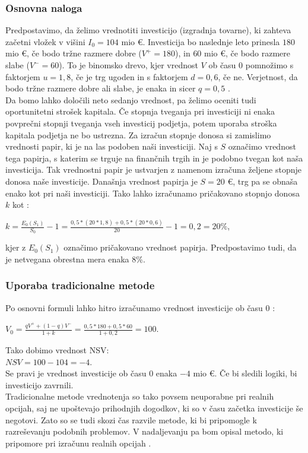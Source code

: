 \subsubsection{Osnovna naloga}
Predpostavimo, da želimo vrednotiti investicijo (izgradnja tovarne), ki zahteva začetni vložek v višini $I_0= 104$ mio €. Investicija bo naslednje leto prinesla $180$ mio €, če bodo tržne razmere dobre ($V^+=180$), in $60$ mio €, če bodo razmere slabe ($V^-=60$). To je binomsko drevo, kjer vrednost $V$ ob času 0 pomnožimo s faktorjem $u=1,8$, če je trg ugoden in s faktorjem $d=0,6$, če ne. Verjetnost, da bodo tržne razmere dobre ali slabe, je enaka in sicer $q=0,5$ \cite[str. 153]{Trigeorgis}. \\
Da bomo lahko določili neto sedanjo vrednost, pa želimo oceniti tudi oportunitetni strošek kapitala. Če stopnja tveganja pri investiciji ni enaka povprečni stopnji tveganja vseh investicij podjetja, potem uporaba stroška kapitala podjetja ne bo ustrezna. Za izračun stopnje donosa si zamislimo vrednosti papir, ki je na las podoben naši investiciji. Naj s $S$ označimo vrednost tega papirja, s katerim se trguje na finančnih trgih in je podobno tvegan kot naša investicija. Tak vrednostni papir je ustvarjen z namenom izračuna željene stopnje donosa naše investicije. Današnja vrednost papirja je $S=20$ €, trg pa se obnaša enako kot pri naši investiciji. Tako lahko izračunamo pričakovano stopnjo donosa $k$ kot \cite[str. 153, 154]{Trigeorgis}:
\begin{center}
$k = \tfrac{E_0(S_1)}{S_0}-1= \tfrac{0,5 * (20*1,8)+0,5*(20*0,6)}{20}-1= 0,2 = 20 \%$,
\end{center}
kjer z $E_0(S_1)$ označimo pričakovano vrednost papirja. Predpostavimo tudi, da je netvegana obrestna mera enaka $8 \%$.\\

\subsubsection{Uporaba tradicionalne metode}
Po osnovni formuli lahko hitro izračunamo vrednost investicije ob času 0 \cite[str. 154]{Trigeorgis}:
\begin{center}
$V_0 = \tfrac{qV^+  + (1-q)V^-}{1+k}= \tfrac{0,5 * 180+0,5*60}{1+0,2}= 100$.
\end{center}
Tako dobimo vrednost NSV:\\
$NSV = 100 - 104 = -4$.\\
Se pravi je vrednost investicije ob času 0 enaka $-4$ mio €. Če bi sledili logiki, bi investicijo zavrnili.\\
Tradicionalne metode vrednotenja so tako povsem neuporabne pri realnih opcijah, saj ne upoštevajo prihodnjih dogodkov, ki so v času začetka investicije še negotovi. Zato so se tudi skozi čas razvile metode, ki bi pripomogle k razreševanju podobnih problemov. V nadaljevanju pa bom opisal metodo, ki pripomore pri izračunu realnih opcijah \cite[str. 154]{Trigeorgis}.\\

